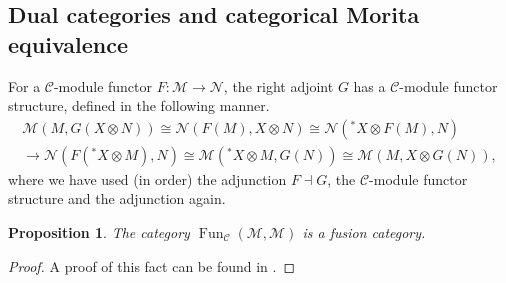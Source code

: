 \documentclass[a4paper, 10pt]{book}
\newtheorem{Prop}[theorem]{Proposition}
\theoremstyle{definition}
\numberwithin{equation}{chapter}
\newcommand\id{\operatorname{id}}
\newcommand\ot{\otimes}
\newcommand\Fun{\operatorname{Fun}}
\newcommand\M{\mathcal{M}}
\newcommand\NN{\mathcal{N}}
\newcommand\C{\mathcal C}
\newcommand{\ra}\rightarrow
\newcommand{\xra}\xrightarrow
\newcommand\ev{\operatorname{ev}}
\newcommand\coev{\operatorname{coev}}
\begin{document}
\subsection{Dual categories and categorical Morita equivalence}
For a $\C$-module functor $F:\M\rightarrow \NN$, the right adjoint $G$ has a $\C$-module functor structure, defined in the following manner. \begin{align}
	\M(M, G(X\otimes N))\cong {\NN}(F(M), X\otimes N) \cong {\NN}({}^*X \otimes F(M), N) \\ \xrightarrow{~} \NN(F({}^*X\otimes M), N) \cong \M({}^*X\ot M, 	 G(N))\cong \M( M, X\ot	 G(N)),
\end{align}
where we have used (in order) the adjunction $F\dashv G$, the $\C$-module functor structure and the adjunction again. 
\begin{Prop}\label{dualfusion}
The category $\Fun_\C(\M, \M)$ is a fusion category.
\end{Prop}
\begin{proof}
A proof of this fact can be found in \cite[Theorem 2.15]{EtiNikOst:FC}.

\end{proof}
\end{document}
